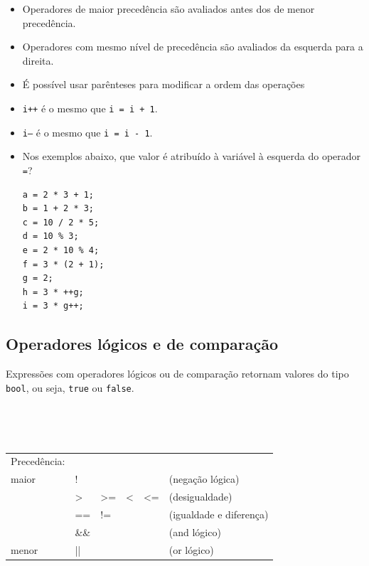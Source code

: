 \begin{itemize}

\item Operadores de maior precedência são avaliados antes dos de menor precedência.
\item Operadores com mesmo nível de precedência são avaliados da esquerda para a direita.
\item É possível usar parênteses para modificar a ordem das operações
\item {\tt i++} é o mesmo que {\tt i = i + 1}.
\item {\tt i--} é o mesmo que {\tt i = i - 1}.

\item Nos exemplos abaixo, que valor é atribuído à variável à esquerda do operador {\tt =}?

\begin{lstlisting}
a = 2 * 3 + 1;
b = 1 + 2 * 3;
c = 10 / 2 * 5;
d = 10 % 3;
e = 2 * 10 % 4;
f = 3 * (2 + 1);
g = 2;
h = 3 * ++g;
i = 3 * g++;
\end{lstlisting}

\end{itemize}

\subsection{Operadores lógicos e de comparação}

Expressões com operadores lógicos ou de comparação retornam valores do tipo {\tt bool}, ou seja, {\tt true} ou {\tt false}.

~\\

{\tt
\begin{tabular}{|l|lllll|}
\hline
Precedência:        &      &    &    &    &                                    \\
maior               & !    &    &    &    & (negação lógica)                   \\
                    & >    & >= & <  & <= & (desigualdade)                     \\
                    & ==   & != &    &    & (igualdade e diferença)            \\
                    & \&\& &    &    &    & (and lógico)                       \\
menor               & ||   &    &    &    & (or lógico)                        \\
\hline
\end{tabular}
}

